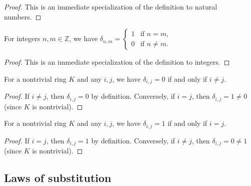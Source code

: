 \begin{proof}
\leanok
This is an immediate specialization of the definition to natural numbers.
\end{proof}

\begin{lemma}
\label{lem.kron-delta.int-eq}
\leanhelper
\leanok
For integers $n,m\in\mathbb{Z}$, we have
$\delta_{n,m} = \begin{cases} 1 & \text{if } n = m, \\ 0 & \text{if } n \neq m. \end{cases}$
\end{lemma}

\begin{proof}
\leanok
This is an immediate specialization of the definition to integers.
\end{proof}

\begin{lemma}
\label{lem.kron-delta.eq-zero-iff}
\leanhelper
\leanok
For a nontrivial ring $K$ and any $i,j$, we have
$\delta_{i,j} = 0$ if and only if $i \neq j$.
\end{lemma}

\begin{proof}
\leanok
If $i \neq j$, then $\delta_{i,j} = 0$ by definition.
Conversely, if $i = j$, then $\delta_{i,j} = 1 \neq 0$ (since $K$ is nontrivial).
\end{proof}

\begin{lemma}
\label{lem.kron-delta.eq-one-iff}
\leanhelper
\leanok
For a nontrivial ring $K$ and any $i,j$, we have
$\delta_{i,j} = 1$ if and only if $i = j$.
\end{lemma}

\begin{proof}
\leanok
If $i = j$, then $\delta_{i,j} = 1$ by definition.
Conversely, if $i \neq j$, then $\delta_{i,j} = 0 \neq 1$ (since $K$ is nontrivial).
\end{proof}

\subsection{Laws of substitution}

